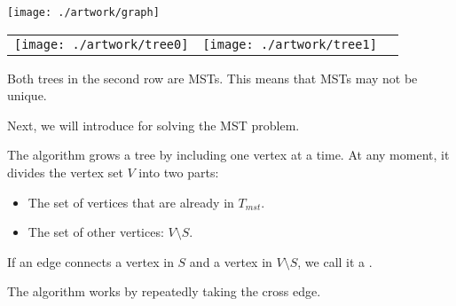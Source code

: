 \documentclass{beamer}
\def\vgap{\vspace{5mm}}
\begin{document}
\begin{frame}
\begin{small}

    \begin{center} 
        \texttt{[image: ./artwork/graph]} \\[2mm] 
        \begin{tabular}{ccc} 
            \texttt{[image: ./artwork/tree0]} &
            \texttt{[image: ./artwork/tree1]}  
        \end{tabular}
    \end{center}

    Both trees in the second row are MSTs. This means that MSTs may not be unique. 
\end{small}    
\end{frame}
\begin{frame}
\begin{small}

    \vgap 
    
   Next, we will introduce  for solving the MST problem.
   
   \vgap
   
    The algorithm grows a tree  by including one vertex at a time. At any moment, it divides the vertex set $V$ into two parts: 
    \begin{itemize} 
        \item The set  of vertices that are already in $T_{mst}$. 
        
        \item The set of other vertices: $V \setminus S$. 
    \end{itemize}
    If an edge connects a vertex in $S$ and a vertex in $V \setminus S$, we call it a .
    
    \vgap 
    
     The algorithm works by repeatedly taking the  cross edge.
\end{small}    
\end{frame}
\end{document}
